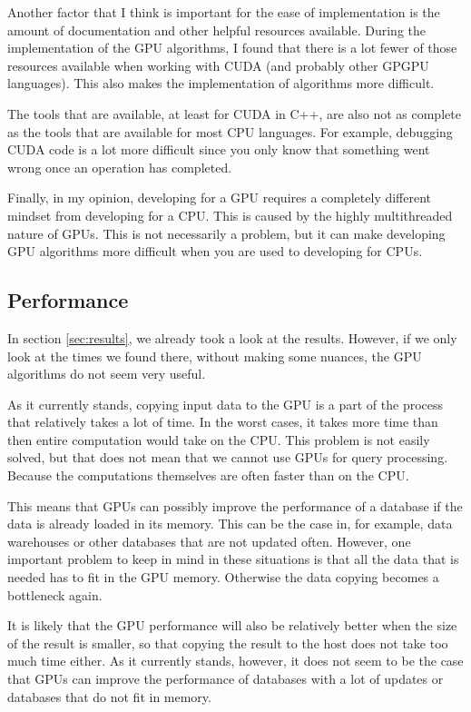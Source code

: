 \documentclass[a4paper,titlepage]{article}
\begin{document}
Another factor that I think is important for the ease of implementation is the amount of documentation and other helpful resources available. During the implementation of the GPU algorithms, I found that there is a lot fewer of those resources available when working with CUDA (and probably other GPGPU languages). This also makes the implementation of algorithms more difficult.

The tools that are available, at least for CUDA in C++, are also not as complete as the tools that are available for most CPU languages. For example, debugging CUDA code is a lot more difficult since you only know that something went wrong once an operation has completed. 

Finally, in my opinion, developing for a GPU requires a completely different mindset from developing for a CPU. This is caused by the highly multithreaded nature of GPUs. This is not necessarily a problem, but it can make developing GPU algorithms more difficult when you are used to developing for CPUs.

\subsection{Performance}
\label{sec:discussion-performance}
In section \ref{sec:results}, we already took a look at the results. However, if we only look at the times we found there, without making some nuances, the GPU algorithms do not seem very useful. 

As it currently stands, copying input data to the GPU is a part of the process that relatively takes a lot of time. In the worst cases, it takes more time than then entire computation would take on the CPU. This problem is not easily solved, but that does not mean that we cannot use GPUs for query processing. Because the computations themselves are often faster than on the CPU. 

This means that GPUs can possibly improve the performance of a database if the data is already loaded in its memory. This can be the case in, for example, data warehouses or other databases that are not updated often. However, one important problem to keep in mind in these situations is that all the data that is needed has to fit in the GPU memory. Otherwise the data copying becomes a bottleneck again. 

It is likely that the GPU performance will also be relatively better when the size of the result is smaller, so that copying the result to the host does not take too much time either. As it currently stands, however, it does not seem to be the case that GPUs can improve the performance of databases with a lot of updates or databases that do not fit in memory.
\end{document}
